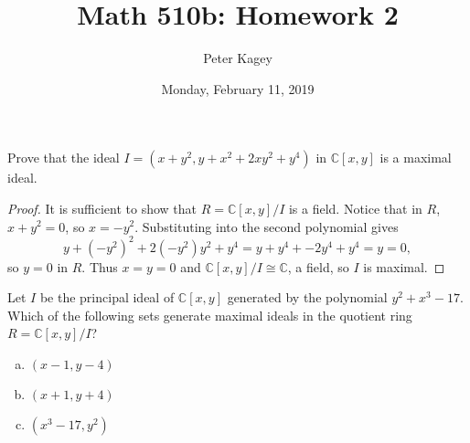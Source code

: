 \documentclass{article}
\newenvironment{problem}[2][Problem]{\begin{trivlist}
\item[\hskip \labelsep {\bfseries #1}\hskip \labelsep {\bfseries #2.}]}{\end{trivlist}}
\begin{document}
\title{Math 510b: Homework 2}
\author{Peter Kagey}
\date{Monday, February 11, 2019}

\maketitle

\begin{problem}{1 (Artin)}
  Prove that the ideal $I = (x + y^2, y + x^2 + 2xy^2 + y^4)$ in
  $\mathbb C[x, y]$ is a maximal ideal.
\end{problem}

\begin{proof}
  It is sufficient to show that $R = \mathbb C[x, y]/I$ is a field.
  Notice that in $R$, $x + y^2 = 0$, so $x = -y^2$. Substituting into the second
  polynomial gives \[
    y + (-y^2)^2 + 2(-y^2)y^2 + y^4
    = y + y^4 + -2y^4 + y^4
    = y
    = 0,
  \] so $y=0$ in $R$. Thus $x = y = 0$ and $\mathbb C[x, y]/I \cong \mathbb C$,
  a field, so $I$ is maximal.
\end{proof}
\begin{problem}{2 (Artin)}
  Let $I$ be the principal ideal of $\mathbb C[x, y]$ generated by the
  polynomial $y^2 + x^3 - 17$. Which of the following sets generate maximal
  ideals in the quotient ring $R = \mathbb C[x, y]/I$?
  \begin{enumerate}[(a)]
    \item $(x - 1, y - 4)$
    \item $(x + 1, y + 4)$
    \item $(x^3 - 17, y^2)$
  \end{enumerate}
\end{problem}
\end{document}
